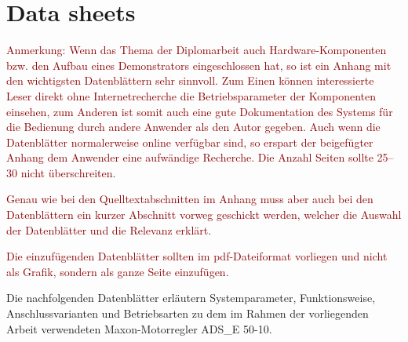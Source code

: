 \chapter{Data sheets}


\textcolor{darkred}{Anmerkung: Wenn das Thema der Diplomarbeit auch Hardware-Komponenten bzw. den Aufbau eines Demonstrators eingeschlossen hat, so ist ein Anhang mit den wichtigsten Datenblättern sehr sinnvoll. Zum Einen können interessierte Leser direkt ohne Internetrecherche die Betriebsparameter der Komponenten einsehen, zum Anderen ist somit auch eine gute Dokumentation des Systems für die Bedienung durch andere Anwender als den Autor gegeben. Auch wenn die Datenblätter normalerweise online verfügbar sind, so erspart der beigefügter Anhang dem Anwender eine aufwändige Recherche. Die Anzahl Seiten sollte 25--30 nicht überschreiten.}

\textcolor{darkred}{Genau wie bei den Quelltextabschnitten im Anhang muss aber auch bei den Datenblättern ein kurzer Abschnitt vorweg geschickt werden, welcher die Auswahl der Datenblätter und die Relevanz erklärt.}

\textcolor{darkred}{Die einzufügenden Datenblätter sollten im pdf-Dateiformat vorliegen und nicht als Grafik, sondern als ganze Seite einzufügen.}


Die nachfolgenden Datenblätter erläutern Systemparameter, Funktionsweise, Anschlussvarianten und Betriebsarten zu dem im Rahmen der vorliegenden Arbeit verwendeten Maxon-Motorregler ADS\_E 50-10.





%
%

